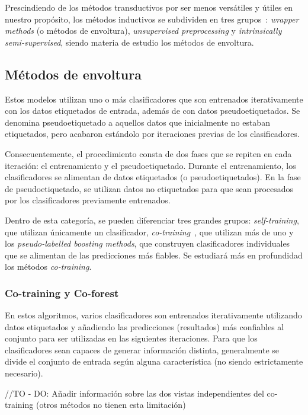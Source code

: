 Prescindiendo de los métodos transductivos por ser menos versátiles y útiles en nuestro propósito, los métodos inductivos se subdividen en tres grupos~\cite{engelen2020surveyOnSemiSupervised}: \textit{wrapper methods} (o métodos de envoltura), \textit{unsupervised preprocessing} y \textit{intrinsically semi-supervised}, siendo materia de estudio los métodos de envoltura. 


\subsection{Métodos de envoltura}

Estos modelos utilizan uno o más clasificadores que son entrenados iterativamente con los datos etiquetados de entrada, además de con datos pseudoetiquetados. Se denomina pseudoetiquetado a aquellos datos que inicialmente no estaban etiquetados, pero acabaron estándolo por iteraciones previas de los clasificadores.

Consecuentemente, el procedimiento consta de dos fases que se repiten en cada iteración: el entrenamiento y el pseudoetiquetado. Durante el entrenamiento, los clasificadores se alimentan de datos etiquetados (o pseudoetiquetados). En la fase de pseudoetiquetado, se utilizan datos no etiquetados para que sean procesados por los clasificadores previamente entrenados. 

Dentro de esta categoría, se pueden diferenciar tres grandes grupos: \textit{self-training}, que utilizan únicamente un clasificador, \textit{co-training}~\cite{engelen2020surveyOnSemiSupervised}, que utilizan más de uno y los \textit{pseudo-labelled boosting methods}, que construyen clasificadores individuales que se alimentan de las predicciones más fiables. Se estudiará más en profundidad los métodos \textit{co-training}.

\subsubsection{Co-training y Co-forest}

En estos algoritmos, varios clasificadores son entrenados iterativamente utilizando datos etiquetados y añadiendo las predicciones (resultados) más confiables al conjunto para ser utilizadas en las siguientes iteraciones. Para que los clasificadores sean capaces de generar información distinta, generalmente se divide el conjunto de entrada según alguna característica (no siendo estrictamente necesario).

//TO - DO: Añadir información sobre las dos vistas independientes del co-training (otros métodos no tienen esta limitación)

